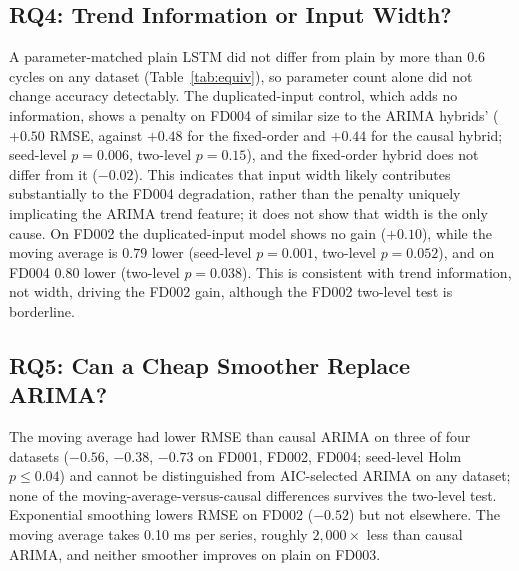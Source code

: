 \documentclass[conference]{IEEEtran}
\begin{document}
\subsection{RQ4: Trend Information or Input Width?}
A parameter-matched plain LSTM did not differ from plain by more than 0.6 cycles on any dataset (Table~\ref{tab:equiv}), so parameter count alone did not change accuracy detectably. The duplicated-input control, which adds no information, shows a penalty on FD004 of similar size to the ARIMA hybrids' ($+0.50$ RMSE, against $+0.48$ for the fixed-order and $+0.44$ for the causal hybrid; seed-level $p=0.006$, two-level $p=0.15$), and the fixed-order hybrid does not differ from it ($-0.02$). This indicates that input width likely contributes substantially to the FD004 degradation, rather than the penalty uniquely implicating the ARIMA trend feature; it does not show that width is the only cause. On FD002 the duplicated-input model shows no gain ($+0.10$), while the moving average is $0.79$ lower (seed-level $p=0.001$, two-level $p=0.052$), and on FD004 $0.80$ lower (two-level $p=0.038$). This is consistent with trend information, not width, driving the FD002 gain, although the FD002 two-level test is borderline.

\subsection{RQ5: Can a Cheap Smoother Replace ARIMA?}
The moving average had lower RMSE than causal ARIMA on three of four datasets ($-0.56$, $-0.38$, $-0.73$ on FD001, FD002, FD004; seed-level Holm $p\le0.04$) and cannot be distinguished from AIC-selected ARIMA on any dataset; none of the moving-average-versus-causal differences survives the two-level test. Exponential smoothing lowers RMSE on FD002 ($-0.52$) but not elsewhere. The moving average takes 0.10 ms per series, roughly $2{,}000\times$ less than causal ARIMA, and neither smoother improves on plain on FD003.
\end{document}
